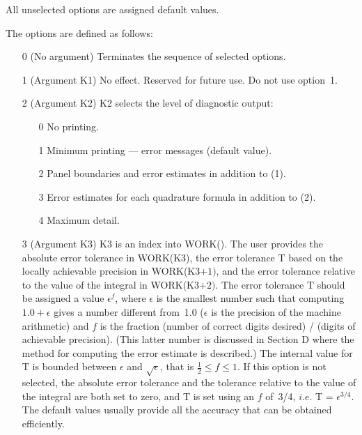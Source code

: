 \documentclass[twoside]{MATH77}
\begin{document}
All unselected options are assigned default values.

The options are defined as follows:
\begin{itemize}
\item[0]  (No argument) Terminates the sequence of selected options.
\item[1]  (Argument K1) No effect. Reserved for future use. Do not use
option~1.
\item[2]  (Argument K2) K2 selects the level of diagnostic output:
\begin{itemize}
\item[0]  No printing.
\item[1]  Minimum printing --- error messages (default value).
\item[2]  Panel boundaries and error estimates in addition to (1).
\item[3]  Error estimates for each quadrature formula in addition to (2).
\item[4]  Maximum detail.
\end{itemize}
\item[3]  (Argument K3) K3 is an index into WORK(). The user provides the
absolute error tolerance in WORK(K3), the error tolerance T based on
the locally achievable precision in WORK(K3$+1)$, and the error tolerance
relative to the value of the integral in WORK(K3$+2)$. The error tolerance
T should be assigned a value $\epsilon ^f$, where $\epsilon $ is the
smallest number such that computing $1.0 + \epsilon $ gives a number
different from~1.0 ($\epsilon $ is the precision of the machine
arithmetic) and $f$ is the fraction (number of correct digits desired)
/ (digits of achievable precision).  (This
latter number is discussed in Section D where the method for
computing the error estimate is described.)  The internal value for T
is bounded between $\epsilon $ and $\sqrt {\epsilon }$, that is
$\frac 12 \leq f \leq 1$.  If this option is not selected, the
absolute error tolerance and the tolerance relative to the value of
the integral are both set to zero, and T is set using an $f$ of~3/4,
$i.e.$ T = $\epsilon ^{3/4}$. The default values usually provide
all the accuracy that can be obtained efficiently.


\end{itemize}
\end{document}
